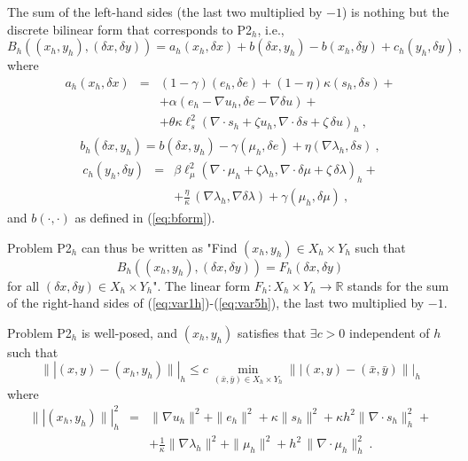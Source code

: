 \documentclass{article}
\begin{document}
\bigskip

The sum of the left-hand sides (the last two multiplied by $-1$) is nothing but the discrete bilinear form that corresponds to P2$_h$, i.e.,
\begin{equation}
B_h((x_h,y_h),(\delta x,\delta y))=a_h(x_h,\delta x)+b(\delta x,y_h)-b(x_h,\delta y)+c_h(y_h,\delta y)~,
\end{equation}
where
\begin{eqnarray}
a_h(x_h,\delta x)&=&(1-\gamma)\left (e_h,\delta e\right )+(1-\eta)\kappa \left ( s_h,\delta s \right ) + \nonumber \\
& & +
\alpha \left ( e_h-\nabla u_h, \delta e - \nabla \delta u \right )+ \nonumber \\
& & + \theta \kappa \ell_s^2  \left ( \nabla \cdot s_h + \zeta u_h , \nabla \cdot \delta s + \zeta\,\delta u \right )_h~,
\end{eqnarray}
\begin{eqnarray}
b_h(\delta x,y_h)=b(\delta x,y_h)-\gamma \left (\mu_h,\delta e\right )+\eta \left (\nabla \lambda_h,\delta s \right ) ~,
\end{eqnarray}
\begin{eqnarray}
 c_h(y_h,\delta y)&= &  \beta \ell_{\mu}^2 \left ( \nabla \cdot \mu_h + \zeta \lambda_h , \nabla \cdot \delta \mu + \zeta\,\delta \lambda \right )_h+ \nonumber \\
 & & + \frac{\eta}{\kappa}\,\left ( \nabla \lambda_h,\nabla \delta \lambda \right ) + \gamma \left ( \mu_h,\delta \mu \right )~,
\end{eqnarray}
and $b(\cdot,\cdot)$ as defined in (\ref{eq:bform}).

Problem P2$_h$ can thus be written as "Find $(x_h,y_h)\in X_h \times Y_h$ such that
\begin{equation}
B_h\left ( \left ( x_h,y_h \right ),\left ( \delta x,\delta y \right ) \right )= F_h(\delta x,\delta y)
\label{eq:BzF}
\end{equation}
for all $(\delta x, \delta y)\in X_h\times Y_h$". The linear form $F_h:X_h\times Y_h \to \mathbb{R}$ stands for the sum of the right-hand sides of (\ref{eq:var1h})-(\ref{eq:var5h}), the last two multiplied by $-1$.

\bigskip

 Problem P2$_h$ is well-posed, and $(x_h,y_h)$ satisfies that $\exists c>0$ independent of $h$ such that
\begin{equation}
\||(x,y)-(x_h,y_h)\||_h \leq c\,\min_{(\bar{x},\bar{y})\in X_h\times Y_h}
\||(x,y)-(\bar{x},\bar{y})\||_h
\label{eq:bestapprox}
\end{equation}
where
\begin{eqnarray}
\||(x_h,y_h)\||_h^2 &=& \|\nabla u_h \|^2 +\|e_h\|^2 + \kappa \|s_h\|^2 + \kappa h^2 \|\nabla \cdot s_h\|_h^2 + \nonumber \\
& &+ \frac{1}{\kappa} \|\nabla \lambda_h\|^2 + \|\mu_h\|^2 + h^2\,\|\nabla \cdot \mu_h\|^2_h~.
\end{eqnarray}
\end{document}

